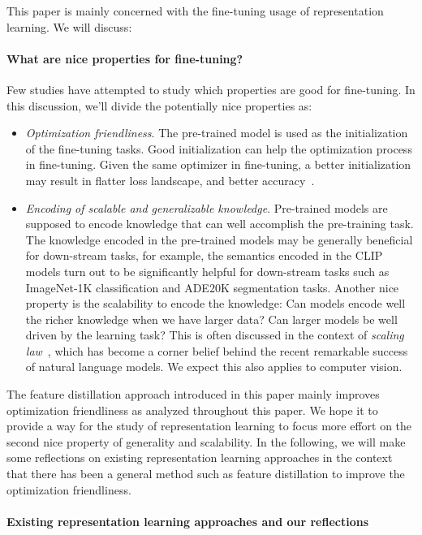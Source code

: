 \documentclass{article}
\begin{document}
This paper is mainly concerned with the fine-tuning usage of representation learning. We will discuss:


\paragraph{What are nice properties for fine-tuning?} Few studies have attempted to study which properties are good for fine-tuning. In this discussion, we'll divide the potentially nice properties as: 

\begin{itemize}
    \item \emph{Optimization friendliness}. The pre-trained model is used as the initialization of the fine-tuning tasks. Good initialization can help the optimization process in fine-tuning. Given the same optimizer in fine-tuning, a better initialization may result in flatter loss landscape, and better accuracy~\cite{losslandscape2017}. 
    \item \emph{Encoding of scalable and generalizable knowledge}. Pre-trained models are supposed to encode knowledge that can well accomplish the pre-training task. The knowledge encoded in the pre-trained models may be generally beneficial for down-stream tasks, for example, the semantics encoded in the CLIP models turn out to be significantly helpful for down-stream tasks such as ImageNet-1K classification and ADE20K segmentation tasks. Another nice property is the scalability to encode the knowledge: Can models encode well the richer knowledge when we have larger data? Can larger models be well driven by the learning task? This is often discussed in the context of \emph{scaling law}~\cite{kaplan2020scaling}, which has become a corner belief behind the recent remarkable success of natural language models. We expect this also applies to computer vision.
\end{itemize}

The feature distillation approach introduced in this paper mainly improves optimization friendliness as analyzed throughout this paper. 
We hope it to provide a way for the study of representation learning to focus more effort on the second nice property of generality and scalability. In the following, we will make some reflections on existing representation learning approaches in the context that there has been a general method such as feature distillation to improve the optimization friendliness.



\paragraph{Existing representation learning approaches and our reflections} 
\end{document}
